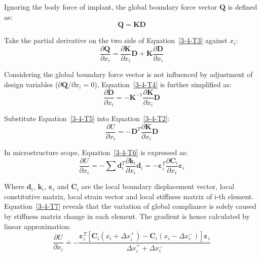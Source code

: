 \documentclass[12pt]{extbook}
\begin{document}
Ignoring the body force of implant, the global boundary force vector $\bm{Q}$ is defined as:
\begin{equation}
\bm{Q} = \bm{K}\bm{D} 
\label{3-4-T3}
\end{equation}

Take the partial derivative on the two side of Equation~\ref{3-4-T3} against $x_i$:
\begin{equation}
\frac{\partial \bm{Q}}{\partial x_i} = \frac{\partial \bm{K}}{\partial x_i}\bm{D} + \bm{K}\frac{\partial \bm{D}}{\partial x_i}
\label{3-4-T4}
\end{equation}

Considering the global boundary force vector is not influenced by adjustment of design variables ($\partial \bm{Q} / \partial x_i = 0$), Equation~\ref{3-4-T4} is further simplified as:
\begin{equation}
\frac{\partial \bm{D}}{\partial x_i} = -\bm{K}^{-1}\frac{\partial \bm{K}}{\partial x_i}\bm{D}
\label{3-4-T5}
\end{equation}

Substitute Equation~\ref{3-4-T5} into Equation~\ref{3-4-T2}:
\begin{equation}
\frac{\partial U}{\partial x_i} = -\bm{D}^T\frac{\partial \bm{K}}{\partial x_i}\bm{D}
\label{3-4-T6}
\end{equation}

In microstructure scope, Equation~\ref{3-4-T6} is expressed as:
\begin{equation}
\frac{\partial U}{\partial x_i} = -\sum\bm{d}_i^T\frac{\partial \bm{k}_i}{\partial x_i}\bm{d}_i = -\bm{\varepsilon}_i^T\frac{\partial \bm{C}_i}{\partial x_i}\bm{\varepsilon}_i
\label{3-4-T7}
\end{equation}

Where $\bm{d}_i$, $\bm{k}_i$, $\bm{\varepsilon}_i$ and $\bm{C}_i$ are the local boundary displacement vector, local constitutive matrix, local strain vector and local stiffness matrix of i-th element.\\

Equation~\ref{3-4-T7} reveals that the variation of global compliance is solely caused by stiffness matrix change in each element. The gradient is hence calculated by linear approximation:
\begin{equation}
\frac{\partial U}{\partial x_i} \doteq -\frac{\bm{\varepsilon}_i^T[\bm{C}_i(x_i + \Delta x_i^+) - \bm{C}_i(x_i - \Delta x_i^-)]\bm{\varepsilon}_i}{\Delta x_i^+ + \Delta x_i^-}
\label{3-4-3}
\end{equation}
\end{document}
